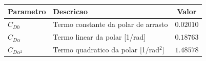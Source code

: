 \begin{tabular}{llc}
\toprule
Parametro & Descricao & Valor \\
\midrule
$C_{D0}$ & Termo constante da polar de arrasto & $0.02010$ \\
$C_{D\alpha}$ & Termo linear da polar [1/rad] & $0.18763$ \\
$C_{D\alpha^2}$ & Termo quadratico da polar [1/rad$^2$] & $1.48578$ \\
\bottomrule
\end{tabular}
